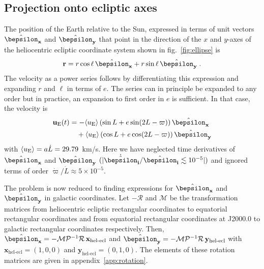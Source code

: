\documentclass[preprintnumbers,a4paper,twocolumn,floats,nofootinbib,superscriptaddress,aps,prd]{revtex4-1}
\newcommand{\epx}{\hat{\bepsilon}_{\mathbf{x}}}
\newcommand{\epy}{\hat{\bepsilon}_{\mathbf{y}}}
\begin{document}
\subsection{Projection onto ecliptic axes}
\label{subsection:ecliptic}

The position of the Earth relative to the Sun, expressed in terms of unit vectors $\epx$ and $\epy$ that point in the direction of the $x$ and $y$-axes of the heliocentric ecliptic coordinate system shown in fig.~\ref{fig:ellipse} is
\begin{equation}
\mathbf{r}=r \cos\ell\, \epx+r \sin \ell\, \epy\;.
\label{eq:r-ecl}
\end{equation}
The velocity as a power series follows by differentiating this expression and expanding $r$ and $\ell$ in terms of $e$. The series can in principle be expanded to any order but in practice, an expansion to first order in $e$ is sufficient. In that case, the velocity is
\begin{equation}
\label{eq:uex1}
\begin{split}
\mathbf{u}_{\rm{E}}(t)&=-\langle u_{\rm{E}}\rangle\left(\sin L+e\sin(2 L-\varpi)\right)\epx\\
&\quad+\langle u_{\rm{E}}\rangle\left(\cos L+e\cos(2 L-\varpi)\right)\epy
\end{split}
\end{equation}
with $\langle u_{\rm{E}}\rangle=a\dot{L}=29.79$~km/s. Here we have neglected time derivatives of $\epx$ and $\epy$ $(|\dot{\hat{\bepsilon}}_{\mathbf{i}}/\hat{\bepsilon}_{\mathbf{i}}\lesssim10^{-5}|)$ and ignored terms of order $\dot{\varpi}/\dot{L}\approx5\times10^{-5}$. 

The problem is now reduced to finding expressions for $\epx$ and $\epy$ in galactic coordinates. Let $-\mathcal{R}$ and $\mathcal{M}$ be the transformation matrices from heliocentric ecliptic rectangular coordinates to equatorial rectangular coordinates and from equatorial rectangular coordinates at J2000.0 to galactic rectangular coordinates respectively. Then, $\epx=-\mathcal{M}\mathcal{P}^{-1}\mathcal{R}\,\mathbf{x}_{\text{hel-ecl}}$ and $\epy=-\mathcal{M}\mathcal{P}^{-1}\mathcal{R}\,\mathbf{y}_{\text{hel-ecl}}$ with $\mathbf{x}_{\text{hel-ecl}}=(1,0,0)$ and $\mathbf{y}_{\text{hel-ecl}}=(0,1,0)$. The elements of these rotation matrices are given in appendix~\ref{app:rotation}.
\end{document}
